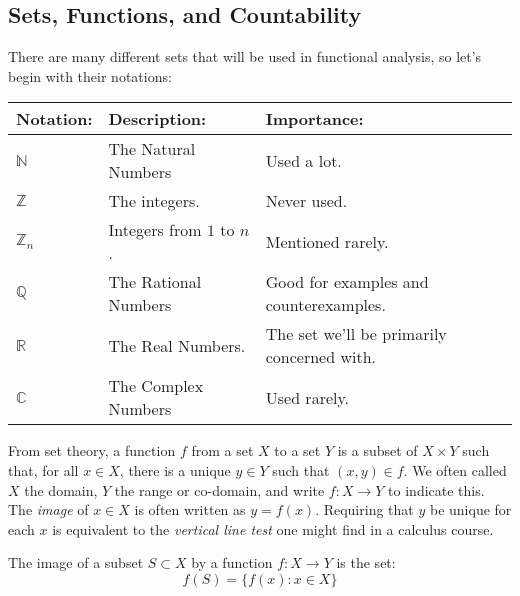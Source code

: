 \documentclass[crop=false,class=book,oneside]{standalone}
\begin{document}
        \subsection{Sets, Functions, and Countability}
            There are many different sets that will be used
            in functional analysis, so let's begin with their
            notations:
            \begin{table}[H]
                \centering
                \begin{tabular}{|l|l|l|}
                    \hline
                    Notation:&Description:&Importance:\\
                    \hline
                    $\mathbb{N}$&The Natural Numbers
                    &Used a lot.\\
                    \hline
                    $\mathbb{Z}$&The integers.&Never used.\\
                    \hline
                    $\mathbb{Z}_{n}$&Integers from $1$ to $n$.
                    &Mentioned rarely.\\
                    \hline
                    $\mathbb{Q}$&The Rational Numbers&
                    Good for examples and counterexamples.\\
                    \hline
                    $\mathbb{R}$&The Real Numbers.&
                    The set we'll be primarily concerned with.\\
                    \hline
                    $\mathbb{C}$&The Complex Numbers&
                    Used rarely.\\
                    \hline
                \end{tabular}
            \end{table}
            From set theory, a function $f$ from a set $X$ to a
            set $Y$ is a subset of $X\times{Y}$ such that, for
            all $x\in{X}$, there is a unique $y\in{Y}$
            such that $(x,y)\in{f}$. We often called $X$ the
            domain, $Y$ the range or co-domain, and write
            $f:X\rightarrow{Y}$ to indicate this. The
            \textit{image} of $x\in{X}$ is often written
            as $y=f(x)$. Requiring that $y$ be unique for each
            $x$ is equivalent to the \textit{vertical line test}
            one might find in a calculus course.
            \begin{definition}
                The image of a subset $S\subset{X}$
                by a function $f:X\rightarrow{Y}$
                is the set:
                \begin{equation*}
                    f(S)=\{f(x):x\in{X}\}
                \end{equation*}
            \end{definition}
\end{document}
